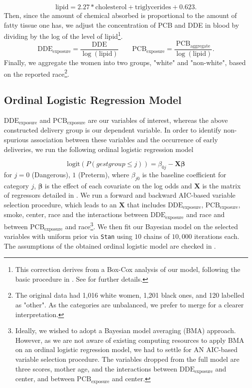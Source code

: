\documentclass[10pt]{jmlr}%
\begin{document}
\begin{equation}
\label{eq:fat}
\text{lipid} = 2.27 * \text{cholesterol} + \text{triglycerides} + 0.623.
\end{equation}
Then, since the amount of chemical absorbed is proportional to the amount of fatty tissue one has, we adjust the concentration of PCB and DDE in blood by dividing by the log of the level of lipid\footnote{This correction derives from a Box-Cox analysis of our model, following the basic procedure in \cite{Li_Long_Duns}. See  for further details.}.
\begin{equation}
\label{eq:exp_dde_pcb}
\text{DDE}_{\text{exposure}} = \dfrac{\text{DDE}}{\log(\text{lipid})} \qquad \text{PCB}_{\text{exposure}} = \dfrac{\text{PCB}_\text{aggregate}}{\log(\text{lipid})}.
\end{equation}
Finally, we aggregate the women into two groups, "white" and "non-white", based on the reported race\footnote{The original data had 1,016 white women, 1,201 black ones, and 120 labelled as "other". As the categories are unbalanced, we prefer to merge for a clearer interpretation.}.

\subsection{Ordinal Logistic Regression Model}
$\text{DDE}_{\text{exposure}}$ and $\text{PCB}_{\text{exposure}}$ are our variables of interest, whereas the above constructed delivery group is our dependent variable. In order to identify non-spurious association between these variables and the occurrence of early deliveries, we run the following ordinal logistic regression model 

\begin{equation}
\label{eq:ordi_logit}
\text{logit}(P(gestgroup \le j)) = \beta_{0j} - \mathbf{X} \boldsymbol{\beta}
\end{equation}
for $j=0$ (Dangerous), $1$ (Preterm), where $\beta_{j0}$ is the baseline coefficient for category $j$, $\boldsymbol{\beta}$ is the effect of each covariate on the log odds and $\mathbf{X}$ is the matrix of regressors detailed in . We run a forward and backward AIC-based variable selection procedure, which leads to an $\mathbf{X}$ that includes $\text{DDE}_{\text{exposure}}$, $\text{PCB}_{\text{exposure}}$, smoke, center, race and the interactions between $\text{DDE}_{\text{exposure}}$ and race and between $\text{PCB}_{\text{exposure}}$ and race\footnote{Ideally, we wished to adopt a Bayesian model averaging (BMA) approach. However, as we are not aware of existing computing resources to apply BMA on an ordinal logistic regression model, we had to settle for AN AIC-based variable selection procedure. The variables dropped from the full model are three scores, mother age, and the interactions between $\text{DDE}_{\text{exposure}}$ and center, and between $\text{PCB}_{\text{exposure}}$ and center.}. We then fit our Bayesian model on the selected variables with uniform prior via {\tt Stan} using $10$ chains of $10,000$ iterations each. The assumptions of the obtained ordinal logistic model are checked in .
\end{document}
